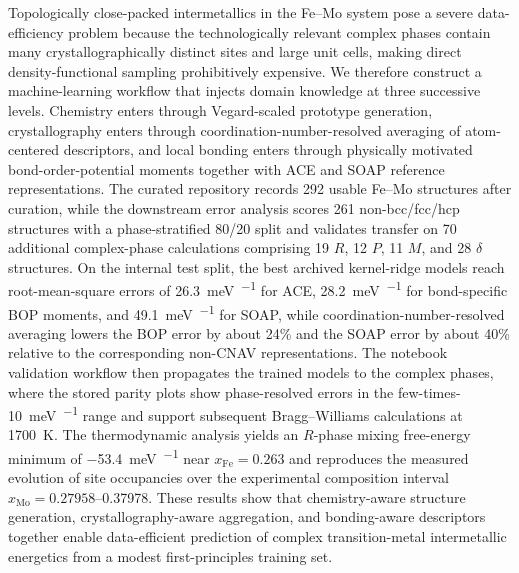 Topologically close-packed intermetallics in the Fe--Mo system pose a severe data-efficiency problem because the technologically relevant complex phases contain many crystallographically distinct sites and large unit cells, making direct density-functional sampling prohibitively expensive. We therefore construct a machine-learning workflow that injects domain knowledge at three successive levels. Chemistry enters through Vegard-scaled prototype generation, crystallography enters through coordination-number-resolved averaging of atom-centered descriptors, and local bonding enters through physically motivated bond-order-potential moments together with ACE and SOAP reference representations. The curated repository records 292 usable Fe--Mo structures after curation, while the downstream error analysis scores 261 non-bcc/fcc/hcp structures with a phase-stratified 80/20 split and validates transfer on 70 additional complex-phase calculations comprising 19 $R$, 12 $P$, 11 $M$, and 28 $\delta$ structures. On the internal test split, the best archived kernel-ridge models reach root-mean-square errors of \SI{26.3}{\milli\electronvolt\per\atom} for ACE, \SI{28.2}{\milli\electronvolt\per\atom} for bond-specific BOP moments, and \SI{49.1}{\milli\electronvolt\per\atom} for SOAP, while coordination-number-resolved averaging lowers the BOP error by about 24\% and the SOAP error by about 40\% relative to the corresponding non-CNAV representations. The notebook validation workflow then propagates the trained models to the complex phases, where the stored parity plots show phase-resolved errors in the few-times-\SI{10}{\milli\electronvolt\per\atom} range and support subsequent Bragg--Williams calculations at \SI{1700}{\kelvin}. The thermodynamic analysis yields an $R$-phase mixing free-energy minimum of \SI{-53.4}{\milli\electronvolt\per\atom} near $x_{\mathrm{Fe}}=0.263$ and reproduces the measured evolution of site occupancies over the experimental composition interval $x_{\mathrm{Mo}}=0.27958$--0.37978. These results show that chemistry-aware structure generation, crystallography-aware aggregation, and bonding-aware descriptors together enable data-efficient prediction of complex transition-metal intermetallic energetics from a modest first-principles training set.
